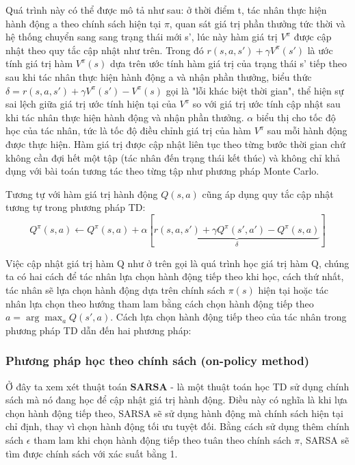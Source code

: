 \documentclass{uetgraduation}
\begin{document}
Quá trình này có thể được mô tả như sau: ở thời điểm t, tác nhân thực hiện hành động a theo chính sách hiện tại $\pi$, quan sát giá trị phần thưởng tức thời và hệ thống chuyển sang
sang trạng thái mới s', lúc này hàm giá trị $V^\pi$ được cập nhật theo quy tắc cập nhật như trên. Trong đó $r(s, a, s') + \gamma V^\pi (s')$ là ước tính giá trị hàm $V^\pi (s)$ dựa
trên ước tính hàm giá trị của trạng thái s' tiếp theo sau khi tác nhân thực hiện hành động a và nhận phần thưởng, biểu thức $\delta = r(s, a, s') + \gamma V^\pi (s') - V^\pi (s)$ gọi là "lỗi khác biệt thời gian", 
thể hiện sự sai lệch giữa giá trị ước tính hiện tại của $V^\pi$ so với giá trị ước tính cập nhật sau khi tác nhân thực hiện hành động và nhận phần thưởng. $\alpha$ biểu thị cho tốc
độ học của tác nhân, tức là tốc độ điều chỉnh giá trị của hàm $V^\pi$ sau mỗi hành động được thực hiện. Hàm giá trị được cập nhật liên tục theo từng bước thời gian chứ không cần đợi
hết một tập (tác nhân đến trạng thái kết thúc) và không chỉ khả dụng với bài toán tương tác theo từng tập như phương pháp Monte Carlo.

Tương tự với hàm giá trị hành động $Q(s, a)$ cũng áp dụng quy tắc cập nhật tương tự trong phương pháp TD:
\begin{equation}
    Q^\pi (s, a) \leftarrow Q^\pi (s, a) + \alpha [\underbrace{r(s, a, s') + \gamma Q^\pi (s', a') - Q^\pi (s, a)}_\delta]
\end{equation}

Việc cập nhật giá trị hàm Q như ở trên gọi là quá trình học giá trị hàm Q, chúng ta có hai cách để tác nhân lựa chọn hành động tiếp theo khi học, cách thứ nhất, tác nhân sẽ lựa chọn
hành động dựa trên chính sách $\pi (s)$ hiện tại hoặc tác nhân lựa chọn theo hướng tham lam bằng cách chọn hành động tiếp theo $a = \arg \max_{a} Q(s', a)$. Cách lựa chọn hành động
tiếp theo của tác nhân trong phương pháp TD dẫn đến hai phương pháp:

\subsubsection{Phương pháp học theo chính sách (on-policy method)}
Ở đây ta xem xét thuật toán $\textbf{SARSA}$ - là một thuật toán học TD sử dụng chính sách mà nó đang học để cập nhật giá trị hành động. Điều này có nghĩa là
khi lựa chọn hành động tiếp theo, SARSA sẽ sử dụng hành động mà chính sách hiện tại chỉ định, thay vì chọn hành động tối ưu tuyệt đối. Bằng cách sử dụng thêm chính sách $\epsilon$
tham lam khi chọn hành động tiếp theo tuân theo chính sách $\pi$, SARSA sẽ tìm được chính sách với xác suất bằng 1.
    
\end{document}
